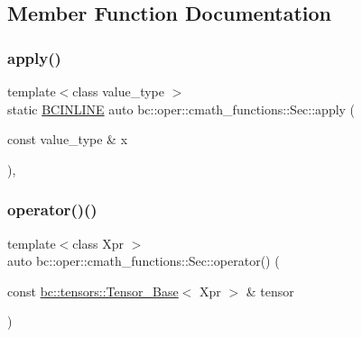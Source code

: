\subsection{Member Function Documentation}
\mbox{\label{structbc_1_1oper_1_1cmath__functions_1_1Sec_a37486c726faad68b0d28a44c26ee8270}} 
\subsubsection{\texorpdfstring{apply()}{apply()}}
{\footnotesize\ttfamily template$<$class value\+\_\+type $>$ \\
static \hyperlink{common_8h_a6699e8b0449da5c0fafb878e59c1d4b1}{B\+C\+I\+N\+L\+I\+NE} auto bc\+::oper\+::cmath\+\_\+functions\+::\+Sec\+::apply (\begin{DoxyParamCaption}\item[{const value\+\_\+type \&}]{x }\end{DoxyParamCaption})\hspace{0.3cm}{\ttfamily [inline]}, {\ttfamily [static]}}

\mbox{\label{structbc_1_1oper_1_1cmath__functions_1_1Sec_aa5360e154a964b8f7c3797a14be39280}} 
\subsubsection{\texorpdfstring{operator()()}{operator()()}\hspace{0.1cm}{\footnotesize\ttfamily [1/3]}}
{\footnotesize\ttfamily template$<$class Xpr $>$ \\
auto bc\+::oper\+::cmath\+\_\+functions\+::\+Sec\+::operator() (\begin{DoxyParamCaption}\item[{const \hyperlink{classbc_1_1tensors_1_1Tensor__Base}{bc\+::tensors\+::\+Tensor\+\_\+\+Base}$<$ Xpr $>$ \&}]{tensor }\end{DoxyParamCaption})\hspace{0.3cm}{\ttfamily [inline]}}

